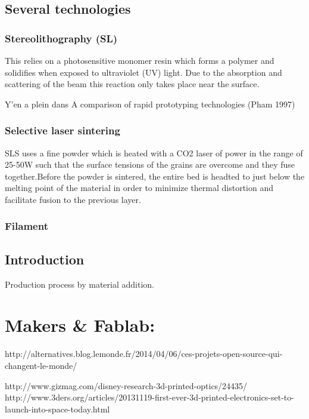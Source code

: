 \subsection{Several technologies} %

\subsubsection{Stereolithography (SL)} %

This relies on a photosensitive monomer resin which forms a polymer and solidifies when exposed to ultraviolet (UV) light. Due to the absorption and scattering of the beam this reaction only takes place near the surface.

Y'en a plein dans A comparison of rapid prototyping technologies (Pham 1997)

\subsubsection{Selective laser sintering} %
SLS uses a fine powder which is heated with a CO2 laser of power in the range of 25-50W such that the surface tensions of the grains are overcome and they fuse together.Before the powder is sintered, the entire bed is headted to just below the melting point of the material in order to minimize thermal distortion and facilitate fusion to the previous layer.

\subsubsection{Filament} %




\subsection{Introduction} %

Production process by material addition.



\section{Makers \& Fablab: } %

http://alternatives.blog.lemonde.fr/2014/04/06/ces-projets-open-source-qui-changent-le-monde/



http://www.gizmag.com/disney-research-3d-printed-optics/24435/
http://www.3ders.org/articles/20131119-first-ever-3d-printed-electronics-set-to-launch-into-space-today.html

